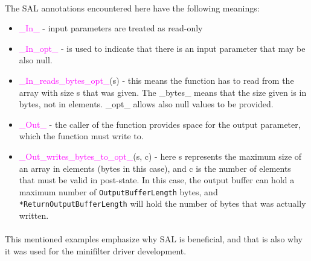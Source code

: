 		\paragraph{}
		The SAL annotations encountered here have the following meanings:
		\begin{itemize}
			\item \textcolor{magenta}{\_In\_} - input parameters are treated as read-only 
			\item \textcolor{magenta}{\_In\_opt\_} - is used to indicate that there is an input parameter that may be also null.
			\item \textcolor{magenta}{\_In\_reads\_bytes\_opt\_}(s) - this means the function has to read from the array with size s that was given. The \_bytes\_ means that the size given is in bytes, not in elements. \_opt\_ allows also null values to be provided.
			\item \textcolor{magenta}{\_Out\_} - the caller of the function provides space for the output parameter, which the function must write to.
			\item \textcolor{magenta}{\_Out\_writes\_bytes\_to\_opt\_}(s, c) - here s represents the maximum size of an array in elements (bytes in this case), and c is the number of elements that must be valid in post-state. In this case, the output buffer can hold a maximum number of \texttt{OutputBufferLength} bytes, and \texttt{*ReturnOutputBufferLength} will hold the number of bytes that was actually written.
		\end{itemize}
		
		\paragraph{}
		This mentioned examples emphasize why SAL is beneficial, and that is also why it was used for the minifilter driver development.
	